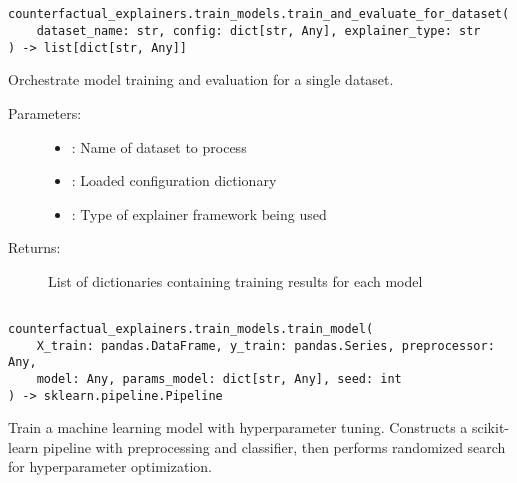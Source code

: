 \subsection{}
\label{func:train_and_evaluate_for_dataset}

\begin{lstlisting}
counterfactual_explainers.train_models.train_and_evaluate_for_dataset(
    dataset_name: str, config: dict[str, Any], explainer_type: str
) -> list[dict[str, Any]]
\end{lstlisting}

Orchestrate model training and evaluation for a single dataset.

\begin{description}
    \item[Parameters:]
        \begin{itemize}
            \item {}: Name of dataset to process
            \item {}: Loaded configuration dictionary
            \item {}: Type of explainer framework being used
        \end{itemize}
    \item[Returns:] List of dictionaries containing training results for each model
\end{description}

\subsection{}
\label{func:train_model}

\begin{lstlisting}
counterfactual_explainers.train_models.train_model(
    X_train: pandas.DataFrame, y_train: pandas.Series, preprocessor: Any,
    model: Any, params_model: dict[str, Any], seed: int
) -> sklearn.pipeline.Pipeline
\end{lstlisting}

Train a machine learning model with hyperparameter tuning. Constructs a scikit-learn pipeline with preprocessing and classifier, then performs randomized search for hyperparameter optimization.

